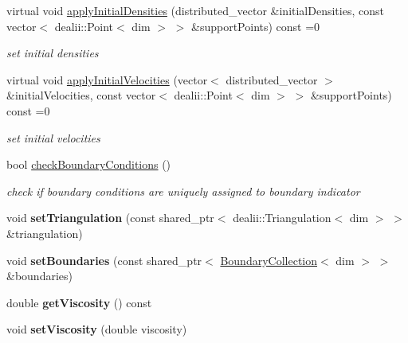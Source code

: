 \begin{DoxyCompactItemize}
\item 
virtual void \hyperlink{classnatrium_1_1ProblemDescription_a2f3da77af3942e626677cbdb04d683a9}{apply\-Initial\-Densities} (distributed\-\_\-vector \&initial\-Densities, const vector$<$ dealii\-::\-Point$<$ dim $>$ $>$ \&support\-Points) const =0
\begin{DoxyCompactList}\small\item\em set initial densities \end{DoxyCompactList}\item 
virtual void \hyperlink{classnatrium_1_1ProblemDescription_a545b19d87ec6dc9c27e8740097f7cace}{apply\-Initial\-Velocities} (vector$<$ distributed\-\_\-vector $>$ \&initial\-Velocities, const vector$<$ dealii\-::\-Point$<$ dim $>$ $>$ \&support\-Points) const =0
\begin{DoxyCompactList}\small\item\em set initial velocities \end{DoxyCompactList}\item 
bool \hyperlink{classnatrium_1_1ProblemDescription_aed8ec93fcba6c0b78c04ef91b8703f7a}{check\-Boundary\-Conditions} ()
\begin{DoxyCompactList}\small\item\em check if boundary conditions are uniquely assigned to boundary indicator \end{DoxyCompactList}\item 
\hypertarget{classnatrium_1_1ProblemDescription_ae588b1e0ce4dd89e2fcfbb0c191b1c41}{void {\bfseries set\-Triangulation} (const shared\-\_\-ptr$<$ dealii\-::\-Triangulation$<$ dim $>$ $>$ \&triangulation)}\label{classnatrium_1_1ProblemDescription_ae588b1e0ce4dd89e2fcfbb0c191b1c41}

\item 
\hypertarget{classnatrium_1_1ProblemDescription_aadca2aac3953fa44bf9ce9cf43dc0417}{void {\bfseries set\-Boundaries} (const shared\-\_\-ptr$<$ \hyperlink{classnatrium_1_1BoundaryCollection}{Boundary\-Collection}$<$ dim $>$ $>$ \&boundaries)}\label{classnatrium_1_1ProblemDescription_aadca2aac3953fa44bf9ce9cf43dc0417}

\item 
\hypertarget{classnatrium_1_1ProblemDescription_a582ecf296837d78a8a00fd598de38de2}{double {\bfseries get\-Viscosity} () const }\label{classnatrium_1_1ProblemDescription_a582ecf296837d78a8a00fd598de38de2}

\item 
\hypertarget{classnatrium_1_1ProblemDescription_ad624cab941ab79af0422e5f7c735e8d8}{void {\bfseries set\-Viscosity} (double viscosity)}\label{classnatrium_1_1ProblemDescription_ad624cab941ab79af0422e5f7c735e8d8}


\end{DoxyCompactItemize}
